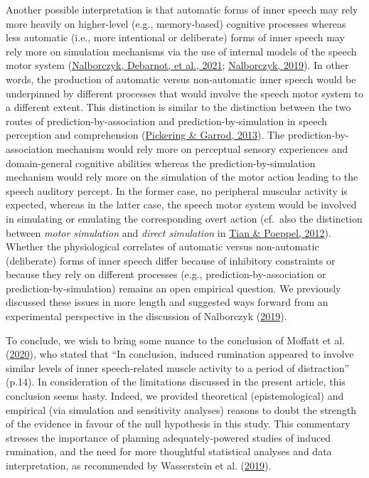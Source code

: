 \documentclass[
  man, donotrepeattitle,floatsintext]{apa6}
\begin{document}
Another possible interpretation is that automatic forms of inner speech may rely more heavily on higher-level (e.g., memory-based) cognitive processes whereas less automatic (i.e., more intentional or deliberate) forms of inner speech may rely more on simulation mechanisms via the use of internal models of the speech motor system (\protect\hyperlink{ref-nalborczyk_role_2021}{Nalborczyk, Debarnot, et al., 2021}; \protect\hyperlink{ref-nalborczyk_understanding_2019}{Nalborczyk, 2019}). In other words, the production of automatic versus non-automatic inner speech would be underpinned by different processes that would involve the speech motor system to a different extent. This distinction is similar to the distinction between the two routes of prediction-by-association and prediction-by-simulation in speech perception and comprehension (\protect\hyperlink{ref-pickering_integrated_2013}{Pickering \& Garrod, 2013}). The prediction-by-association mechanism would rely more on perceptual sensory experiences and domain-general cognitive abilities whereas the prediction-by-simulation mechanism would rely more on the simulation of the motor action leading to the speech auditory percept. In the former case, no peripheral muscular activity is expected, whereas in the latter case, the speech motor system would be involved in simulating or emulating the corresponding overt action (cf.~also the distinction between \emph{motor simulation} and \emph{direct simulation} in \protect\hyperlink{ref-tian_mental_2012}{Tian \& Poeppel, 2012}). Whether the physiological correlates of automatic versus non-automatic (deliberate) forms of inner speech differ because of inhibitory constraints or because they rely on different processes (e.g., prediction-by-association or prediction-by-simulation) remains an open empirical question. We previously discussed these issues in more length and suggested ways forward from an experimental perspective in the discussion of Nalborczyk (\protect\hyperlink{ref-nalborczyk_understanding_2019}{2019}).

To conclude, we wish to bring some nuance to the conclusion of Moffatt et al. (\protect\hyperlink{ref-moffatt_inner_2020}{2020}), who stated that ``In conclusion, induced rumination appeared to involve similar levels of inner speech-related muscle activity to a period of distraction'' (p.14). In consideration of the limitations discussed in the present article, this conclusion seems hasty. Indeed, we provided theoretical (epistemological) and empirical (via simulation and sensitivity analyses) reasons to doubt the strength of the evidence in favour of the null hypothesis in this study. This commentary stresses the importance of planning adequately-powered studies of induced rumination, and the need for more thoughtful statistical analyses and data interpretation, as recommended by Wasserstein et al. (\protect\hyperlink{ref-wasserstein_moving_2019}{2019}).
\end{document}
